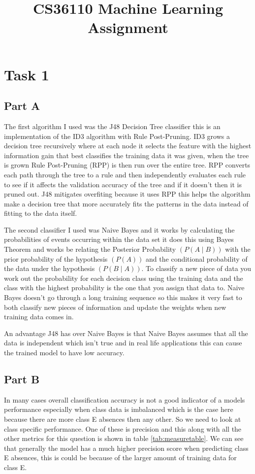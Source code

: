 \documentclass[10pt]{article}
\title {CS36110 Machine Learning Assignment}
\date{}                                           %
\begin{document}
\maketitle

\section*{Task 1}

\subsection*{Part A}
The first algorithm I used was the J48 Decision Tree classifier this is an implementation of the ID3 algorithm with Rule Post-Pruning. ID3 grows a decision tree recursively where at each node it selects the feature with the highest information gain that best classifies the training data it was given, when the tree is grown Rule Post-Pruning (RPP) is then run over the entire tree. RPP converts each path through the tree to a rule and then independently evaluates each rule to see if it affects the validation accuracy of the tree and if it doesn't then it is pruned out. J48 mitigates overfiting because it uses RPP this helps the algorithm make a decision tree that more accurately fits the patterns in the data instead of fitting to the data itself.

The second classifier I used was Naive Bayes and it works by calculating the probabilities of events occurring within the data set it does this using Bayes Theorem and works be relating the Posterior Probability $(P(A \mid B))$ with the prior probability of the hypothesis $(P(A))$ and the conditional probability of the data under the hypothesis $(P(B \mid A))$. To classify a new piece of data you work out the probability for each decision class using the training data and the class with the highest probability is the one that you assign that data to. Naive Bayes doesn't go through a long training sequence so this makes it very fast to both classify new pieces of information and update the weights when new training data comes in.

An advantage J48 has over Naive Bayes is that Naive Bayes assumes that all the data is independent which isn't true and in real life applications this can cause the trained model to have low accuracy.

\subsection*{Part B}
In many cases overall classification accuracy is not a good indicator of a models performance especially when class data is imbalanced which is the case here because there are more class E absences then any other. So we need to look at class specific performance. One of these is precision and this along with all the other metrics for this question is shown in table \ref{tab:measuretable}. We can see that generally the model has a much higher precision score when predicting class E absences, this is could be because of the larger amount of training data for class E.
\end{document}
